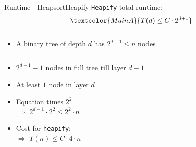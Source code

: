 \begin{frame}{Runtime - Heapsort}{Heapify}
  \texttt{Heapify} total runtime:
  \begin{displaymath}
    \textcolor{MainA}{T(d) \leq C \cdot 2^{d + 1}}
  \end{displaymath}
  \vspace{-1em}
  \begin{columns}
    \begin{column}{\linewidth}
      \begin{itemize}
        \item<2- |handout:1>
        A binary tree of depth {\color{MainA}$d$} has
        {\color{MainA}$2^{d-1} \leq n$} nodes
      \end{itemize}
    \end{column}
    \begin{column}{0pt}\end{column} %
  \end{columns}
  \begin{columns}
    \begin{column}[t]{0.5\linewidth}
      \begin{itemize}
        \item<5- |handout:1>
          {\color{MainB}$2^{d-1} - 1$} nodes in full tree till layer
          {\color{MainB}$d - 1$}
        \item<6- |handout:1>
          At least {\color{MainA}$1$} node in layer {\color{MainA}$d$}
          \vspace{1.0em}
        \item<7- |handout:1>
          {\color{Hint}Equation times $2^2$}\\
          $\Rightarrow$ {\color{MainA}$2^{d-1} \cdot 2^2 \leq 2^2 \cdot n$}
        \item<8- |handout:1>
          Cost for \texttt{heapify}:\\
          $\Rightarrow$ {\color{MainA}$T(n) \leq C \cdot 4 \cdot n$}
      \end{itemize}
    \end{column}
    \begin{column}[t]{0.5\linewidth}
    \end{column}
  \end{columns}
\end{frame}